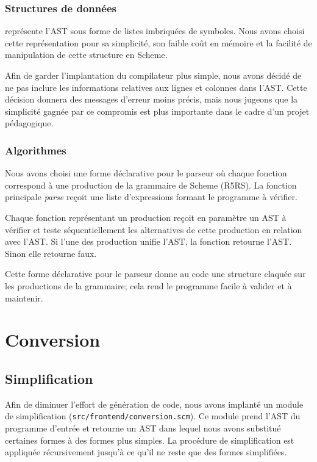 \documentclass[10pt]{report}
\begin{document}
\subsection{Structures de données}

\sins{} représente l'AST sous forme de listes imbriquées de symboles. Nous
avons choisi cette représentation pour sa simplicité, son faible coût en
mémoire et la facilité de manipulation de cette structure en Scheme.

Afin de garder l'implantation du compilateur plus simple, nous avons
décidé de ne pas inclure les informations relatives aux lignes et
colonnes dans l'AST. Cette décision donnera des messages d'erreur
moins précis, mais nous jugeons que la simplicité gagnée par ce
compromis est plus importante dans le cadre d'un projet pédagogique.

\subsection{Algorithmes}

Nous avons choisi une forme déclarative pour le parseur où chaque fonction
correspond à une production de la grammaire de Scheme (R5RS). La fonction
principale \emph{parse} reçoit une liste d'expressions formant le programme à
vérifier.

Chaque fonction représentant un production reçoit en paramètre un AST à
vérifier et teste séquentiellement les alternatives de cette production en
relation avec l'AST. Si l'une des production unifie l'AST, la fonction retourne
l'AST. Sinon elle retourne faux.

Cette forme déclarative pour le parseur donne au code une structure
claquée sur les productions de la grammaire; cela rend le programme
facile à valider et à maintenir.


\chapter{Conversion}

\section{Simplification}

Afin de diminuer l'effort de génération de code, nous avons implanté
un module de simplification ({\tt src/frontend/conversion.scm}). Ce
module prend l'AST du programme d'entrée et retourne un AST dans
lequel nous avons substitué certaines formes à des formes plus
simples. La procédure de simplification est appliquée récursivement
jusqu'à ce qu'il ne reste que des formes simplifiées.
\end{document}
